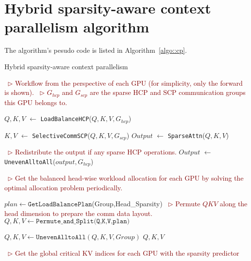 
\section{Hybrid sparsity-aware context parallelism algorithm}\label{appendix:algo}

The algorithm's pesudo code is listed in Algorithm~\ref{algo::cp}.
\begin{algorithm}[h]
\caption{Hybrid sparsity-aware context parallelism}\label{algo::cp}
\begin{algorithmic}[1]
\small
\Statex 

\small
\Statex\quad\ {\textcolor{Maroon}{$\triangleright$ {Workflow from the perspective of each GPU (for simplicity, only the forward is shown).}}}
\Statex\quad\ {\textcolor{Maroon}{$\triangleright$ {$G_{hcp}$ and $G_{scp}$ are the sparse HCP and SCP communication groups this GPU belongs to. }}}


\State $Q,K,V$ $\gets$ \texttt{LoadBalanceHCP}($Q,K,V,G_{hcp}$)
\EndIf

\State $K, V$ $\gets$ \texttt{SelectiveCommSCP}($Q, K, V, G_{scp}$)
\EndIf
\State $Output$ $\gets$ \texttt{SparseAttn}($Q,K,V$)

\Statex\quad\ {\textcolor{Maroon}{$\triangleright$ {Redistribute the output if any sparse HCP operations.}}}
\State $Output$ $\gets$ \texttt{UnevenAlltoAll}($output,G_{hcp}$)
\EndIf
\EndFunction

    \Statex\quad\ {\textcolor{Maroon}{$\triangleright$ {Get the balanced head-wise workload allocation for each GPU by solving the optimal allocation problem periodically.}}}
    
    \State $plan \gets \texttt{GetLoadBalancePlan}$(Group,Head\_Sparsity)
    \Statex\quad\ {\textcolor{Maroon}{$\triangleright$ {Permute $QKV$ along the head dimension to prepare the comm data layout.}}}
    \State $Q,K,V \gets \texttt{Permute\_and\_Split(Q,K,V,plan)}$

    \State $Q,K,V \gets \texttt{UnevenAlltoAll}(Q,K,V,Group)$
   \State \Return $Q,K,V$
  
        

\EndFunction

 \Statex\quad\ {\textcolor{Maroon}{$\triangleright$ {Get the global critical KV indices for each GPU with the sparsity predictor}}}
 

\end{algorithmic}
\end{algorithm}
